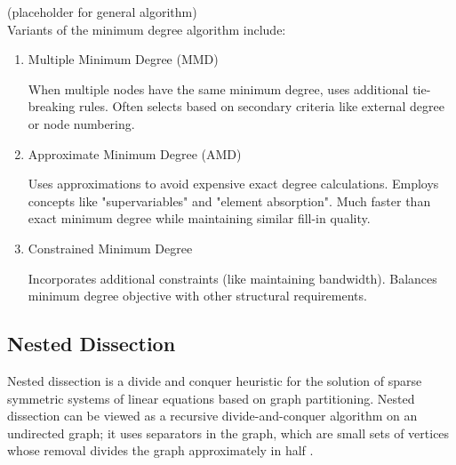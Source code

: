 (placeholder for general algorithm) \\

Variants of the minimum degree algorithm include:

\begin{enumerate}
    \item Multiple Minimum Degree (MMD)

    When multiple nodes have the same minimum degree, uses additional tie-breaking rules. Often selects based on secondary criteria like external degree or node numbering.

    \item Approximate Minimum Degree (AMD)

    Uses approximations to avoid expensive exact degree calculations. Employs concepts like "supervariables" and "element absorption". Much faster than exact minimum degree while maintaining similar fill-in quality.

    \item Constrained Minimum Degree

    Incorporates additional constraints (like maintaining bandwidth). Balances minimum degree objective with other structural requirements.

\end{enumerate}

\subsection{Nested Dissection}

Nested dissection is a divide and conquer heuristic for the solution of sparse symmetric systems of linear equations based on graph partitioning. Nested dissection can be viewed as a recursive divide-and-conquer algorithm on an undirected graph; it uses separators in the graph, which are small sets of vertices whose removal divides the graph approximately in half  \cite{lipton_generalized_1979}.

